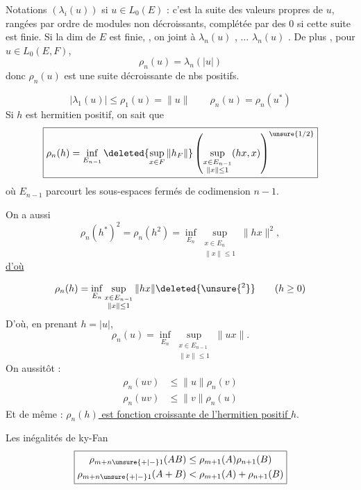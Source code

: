 
Notations $(\lambda_i(u))$ si $u\in L_0(E)$ : c'est la suite des valeurs  propres de $u$, rangées par ordre de modules non décroissants, complétée par des $0$ si cette suite est finie.
Si la dim de $E$ est finie, ,  on joint  à $\lambda_n(u)$ , $\ldots$ $\lambda_n(u)$  .
De plus , pour $u\in L_0(E,F)$,
\[
\boxed{\rho_n(u)=\lambda_n(|u|)}
\]
donc $\rho_n(u)$ est une suite décroissante de nbs positifs.

\qquad{}
\[
\boxed{|\lambda_1(u)|\leq\rho_1(u)=\|u\|}\qquad
\boxed{\rho_n(u)=\rho_n(u^*)}
\]
Si $h$ est hermitien positif, on sait que
\[
\boxed{\rho_n(h)=\inf_{E_{n-1}}\deleted{\sup_{x\in F}\|h_F\|}\left(\sup_{\substack{x\in E_{n-1}\\\|x\|\leq1}}(hx,x)\right)^{\unsure{1/2}}}
\]
où  $E_{n-1}$ parcourt  les sous-espaces  fermés de codimension $n-1$.

On a aussi
\[
\rho_n(h^{*})^2=\rho_n(h^2)=\inf_{E_n}\sup_{\substack{x\in E_n\\\|x\|\leq1}}\|hx\|^2,
\]
\uline{d'où}

\[
\rho_n(h)=\inf_{E_n}\sup_{\substack{x\in E_{n-1}\\\|x\|\leq1}}\|hx\|\deleted{\unsure{{}^2}}\qquad(h\geq0)
\]
D'où, en prenant $h=|u|$,
\[
\boxed{\rho_n(u)=\inf_{E_n}\sup_{\substack{x\in E_{n-1}\\\|x\|\leq1}}\|ux\|}.
\]
On   aussitôt :
\[
\boxed{\begin{aligned}
\rho_n(uv)&\leq\|u\|\rho_n(v)\\
\rho_n(uv)&\leq\|v\|\rho_n(u)
\end{aligned}}
\]
Et de même : \uline{$\rho_n(h)$ est fonction croissante de l'hermitien positif $h$}.

Les inégalités de ky-Fan
\[
\boxed{\begin{aligned}
\rho_{m+n\unsure{+|-}1}(AB)&\leq\rho_{m+1}(A)\rho_{n+1}(B)\\
\rho_{m+n\unsure{+|-}1}(A+B)&<\rho_{m+1}(A)+\rho_{n+1}(B)
\end{aligned}}
\]
